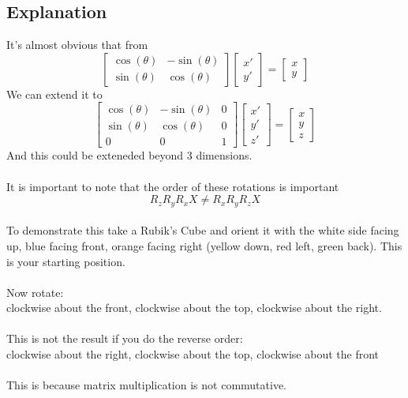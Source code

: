 \documentclass[11pt]{book}
\begin{document}
\subsection{Explanation}
It's almost obvious that from \\
\[
\left[ \begin{matrix}
\cos(\theta) & -\sin(\theta) \\
\sin(\theta) &  \cos(\theta) 
\end{matrix}\right] 
\left[ \begin{matrix}
x' \\
y'
\end{matrix} \right] =
\left[ \begin{matrix}
x \\
y
\end{matrix} \right]
\]
We can extend it to\\
\[
\left[ \begin{matrix}
\cos(\theta) & -\sin(\theta) & 0\\
\sin(\theta) &  \cos(\theta) & 0\\
0 & 0 & 1
\end{matrix}\right] 
\left[ \begin{matrix}
x' \\
y' \\
z'
\end{matrix} \right] =
\left[ \begin{matrix}
x \\
y \\
z
\end{matrix} \right]
\]
And this could be exteneded beyond 3 dimensions.\\
\\
It is important to note that the order of these rotations is important
\[R_zR_yR_xX \ne R_xR_yR_zX\]
\\
To demonstrate this take a Rubik's Cube and orient it with the white side facing up, blue facing front, orange facing right (yellow down, red left, green back).  This is your starting position. \\
\\
Now rotate:\\
clockwise about the front, clockwise about the top, clockwise about the right.\\
\\
This is not the result if you do the reverse order:\\
clockwise about the right, clockwise about the top, clockwise about the front\\
\\
This is because matrix multiplication is not commutative.
\end{document}
